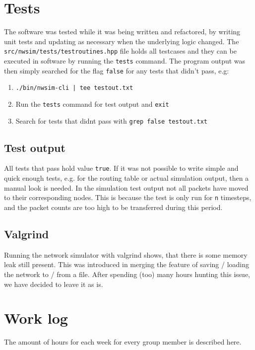 \section{Tests}
The software was tested while it was being written and refactored, by writing unit tests and updating as necessary when the underlying logic changed. The \texttt{src/nwsim/tests/testroutines.hpp} file holds all testcases and they can be executed in software by running the \texttt{tests} command. The program output was then simply searched for the flag \texttt{false} for any tests that didn't pass, e.g:
\begin{enumerate}
    \item \texttt{./bin/nwsim-cli | tee testout.txt}
    \item Run the \texttt{tests} command for test output and \texttt{exit}
    \item Search for tests that didnt pass with \texttt{grep false testout.txt}
\end{enumerate}

\subsection{Test output}
All tests that pass hold value \texttt{true}. If it was not possible to write simple and quick enough tests, e.g. for the routing table or actual simulation output, then a manual look is needed. In the simulation test output not all packets have moved to their corresponding nodes. This is because the test is only run for \texttt{n} timesteps, and the packet counts are too high to be transferred during this period. 

\subsection{Valgrind}
Running the network simulator with valgrind shows, that there is some memory leak still present. This was introduced in merging the feature of saving / loading the network to / from a file. After spending (too) many hours hunting this issue, we have decided to leave it as is.
\lstset{basicstyle=\scriptsize,breaklines=true}





\section{Work log}
The amount of hours for each week for every group member is described here.

